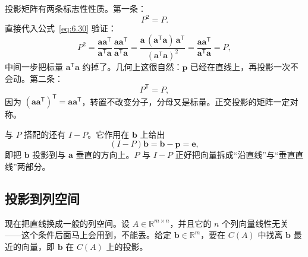 \documentclass[UTF8,a4paper,12pt]{ctexart}
\numberwithin{equation}{section}
\newcommand{\R}{\mathbb{R}}
\newcommand{\trans}{^{\mathsf T}}
\begin{document}
	投影矩阵有两条标志性性质。第一条：
	\begin{equation}\label{eq:6.34}
	P^2=P.
	\end{equation}
直接代入公式~\eqref{eq:6.30} 验证：
	\begin{equation}\label{eq:6.35}
	P^2
	=\frac{\bm{a}\bm{a}\trans}{\bm{a}\trans\bm{a}}\,
	\frac{\bm{a}\bm{a}\trans}{\bm{a}\trans\bm{a}}
	=\frac{\bm{a}\,(\bm{a}\trans\bm{a})\,\bm{a}\trans}{(\bm{a}\trans\bm{a})^2}
	=\frac{\bm{a}\bm{a}\trans}{\bm{a}\trans\bm{a}}
	=P,
	\end{equation}
	中间一步把标量 $\bm{a}\trans\bm{a}$ 约掉了。几何上这很自然：$\bm{p}$ 已经在直线上，再投影一次不会动。第二条：
	\begin{equation}\label{eq:6.36}
	P\trans=P,
	\end{equation}
	因为 $(\bm{a}\bm{a}\trans)\trans=\bm{a}\bm{a}\trans$，转置不改变分子，分母又是标量。正交投影的矩阵一定对称。

	与 $P$ 搭配的还有 $I-P$。它作用在 $\bm{b}$ 上给出
	\begin{equation}\label{eq:6.37}
	(I-P)\bm{b}=\bm{b}-\bm{p}=\bm{e},
	\end{equation}
	即把 $\bm{b}$ 投影到与 $\bm{a}$ 垂直的方向上。$P$ 与 $I-P$ 正好把向量拆成“沿直线”与“垂直直线”两部分。

	\subsection{投影到列空间}

	现在把直线换成一般的列空间。设 $A\in\R^{m\times n}$，并且它的 $n$ 个列向量线性无关——这个条件后面马上会用到，不能丢。给定 $\bm{b}\in\R^m$，要在 $C(A)$ 中找离 $\bm{b}$ 最近的向量，即 $\bm{b}$ 在 $C(A)$ 上的投影。
\end{document}
